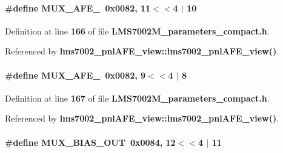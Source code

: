 \paragraph[{M\+U\+X\+\_\+\+A\+F\+E\+\_\+1}]{\setlength{\rightskip}{0pt plus 5cm}\#define M\+U\+X\+\_\+\+A\+F\+E\+\_~0x0082, 11$<$$<$4 $\vert$  10}\label{LMS7002M__parameters__compact_8h_a730cb8655c372446f2bb14d4cc3ef06c}


Definition at line {\bf 166} of file {\bf L\+M\+S7002\+M\+\_\+parameters\+\_\+compact.\+h}.



Referenced by {\bf lms7002\+\_\+pnl\+A\+F\+E\+\_\+view\+::lms7002\+\_\+pnl\+A\+F\+E\+\_\+view()}.

\paragraph[{M\+U\+X\+\_\+\+A\+F\+E\+\_\+2}]{\setlength{\rightskip}{0pt plus 5cm}\#define M\+U\+X\+\_\+\+A\+F\+E\+\_~0x0082, 9$<$$<$4 $\vert$  8}\label{LMS7002M__parameters__compact_8h_a94d47db51b3010e0240b7155681ca920}


Definition at line {\bf 167} of file {\bf L\+M\+S7002\+M\+\_\+parameters\+\_\+compact.\+h}.



Referenced by {\bf lms7002\+\_\+pnl\+A\+F\+E\+\_\+view\+::lms7002\+\_\+pnl\+A\+F\+E\+\_\+view()}.

\paragraph[{M\+U\+X\+\_\+\+B\+I\+A\+S\+\_\+\+O\+UT}]{\setlength{\rightskip}{0pt plus 5cm}\#define M\+U\+X\+\_\+\+B\+I\+A\+S\+\_\+\+O\+UT~0x0084, 12$<$$<$4 $\vert$  11}\label{LMS7002M__parameters__compact_8h_a5d27f1db59a347743ba345f18e23c208}


